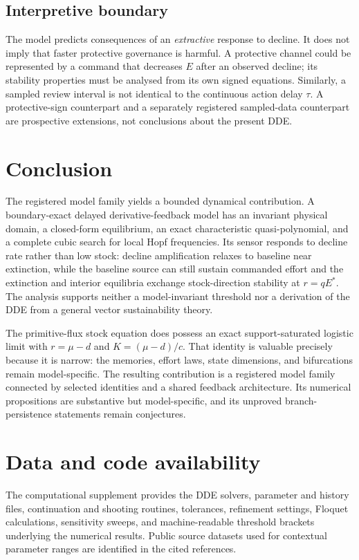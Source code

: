 \documentclass[11pt]{article}
\begin{document}
\subsection{Interpretive boundary}

The model predicts consequences of an \emph{extractive} response to decline. It does not imply that faster protective governance is harmful. A protective channel could be represented by a command that decreases $E$ after an observed decline; its stability properties must be analysed from its own signed equations. Similarly, a sampled review interval is not identical to the continuous action delay $\tau$. A protective-sign counterpart and a separately registered sampled-data counterpart are prospective extensions, not conclusions about the present DDE.

\section{Conclusion}

The registered model family yields a bounded dynamical contribution. A boundary-exact delayed derivative-feedback model has an invariant physical domain, a closed-form equilibrium, an exact characteristic quasi-polynomial, and a complete cubic search for local Hopf frequencies. Its sensor responds to decline rate rather than low stock: decline amplification relaxes to baseline near extinction, while the baseline source can still sustain commanded effort and the extinction and interior equilibria exchange stock-direction stability at $r=qE^*$. The analysis supports neither a model-invariant threshold nor a derivation of the DDE from a general vector sustainability theory.

The primitive-flux stock equation does possess an exact support-saturated logistic limit with $r=\mu-d$ and $K=(\mu-d)/c$. That identity is valuable precisely because it is narrow: the memories, effort laws, state dimensions, and bifurcations remain model-specific. The resulting contribution is a registered model family connected by selected identities and a shared feedback architecture. Its numerical propositions are substantive but model-specific, and its unproved branch-persistence statements remain conjectures.

\section*{Data and code availability}
The computational supplement provides the DDE solvers, parameter and history files, continuation and shooting routines, tolerances, refinement settings, Floquet calculations, sensitivity sweeps, and machine-readable threshold brackets underlying the numerical results. Public source datasets used for contextual parameter ranges are identified in the cited references.


\end{document}
